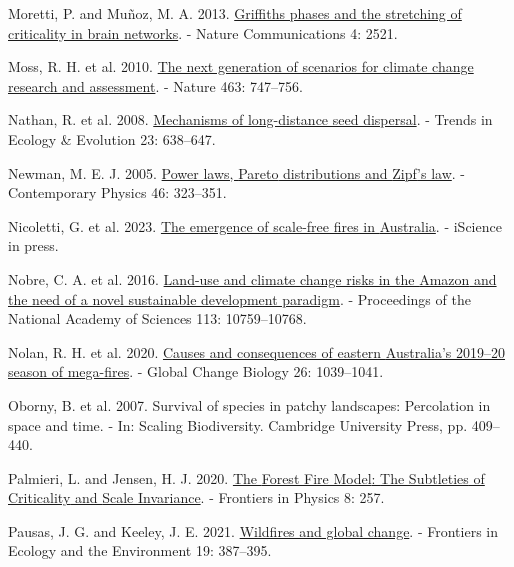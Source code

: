 \documentclass[
]{article}
\newlength{\cslhangindent}
\newenvironment{CSLReferences}[2] %
 {\begin{list}{}{%
  \setlength{\itemindent}{0pt}
  \setlength{\leftmargin}{0pt}
  \setlength{\parsep}{0pt}
  \ifodd #1
   \setlength{\leftmargin}{\cslhangindent}
   \setlength{\itemindent}{-1\cslhangindent}
  \fi
  \setlength{\itemsep}{#2\baselineskip}}}
 {\end{list}}
\begin{document}
\begin{CSLReferences}{1}{1}
Moretti, P. and Muñoz, M. A. 2013.
\href{https://doi.org/10.1038/ncomms3521}{Griffiths phases and the
stretching of criticality in brain networks}. - Nature Communications 4:
2521.

Moss, R. H. et al. 2010. \href{https://doi.org/10.1038/nature08823}{The
next generation of scenarios for climate change research and
assessment}. - Nature 463: 747--756.

Nathan, R. et al. 2008.
\href{https://doi.org/10.1016/j.tree.2008.08.003}{Mechanisms of
long-distance seed dispersal}. - Trends in Ecology \& Evolution 23:
638--647.

Newman, M. E. J. 2005.
\href{https://doi.org/10.1080/00107510500052444}{Power laws, {Pareto}
distributions and {Zipf}'s law}. - Contemporary Physics 46: 323--351.

Nicoletti, G. et al. 2023.
\href{https://doi.org/10.1016/j.isci.2023.106181}{The emergence of
scale-free fires in {Australia}}. - iScience in press.

Nobre, C. A. et al. 2016.
\href{https://doi.org/10.1073/pnas.1605516113}{Land-use and climate
change risks in the {Amazon} and the need of a novel sustainable
development paradigm}. - Proceedings of the National Academy of Sciences
113: 10759--10768.

Nolan, R. H. et al. 2020.
\href{https://doi.org/10.1111/gcb.14987}{Causes and consequences of
eastern {Australia}'s 2019--20 season of mega-fires}. - Global Change
Biology 26: 1039--1041.

Oborny, B. et al. 2007. Survival of species in patchy landscapes:
Percolation in space and time. - In: Scaling {Biodiversity}. {Cambridge
University Press}, pp. 409--440.

Palmieri, L. and Jensen, H. J. 2020.
\href{https://doi.org/10.3389/fphy.2020.00257}{The {Forest Fire Model}:
{The Subtleties} of {Criticality} and {Scale Invariance}}. - Frontiers
in Physics 8: 257.

Pausas, J. G. and Keeley, J. E. 2021.
\href{https://doi.org/10.1002/fee.2359}{Wildfires and global change}. -
Frontiers in Ecology and the Environment 19: 387--395.


\end{CSLReferences}
\end{document}
